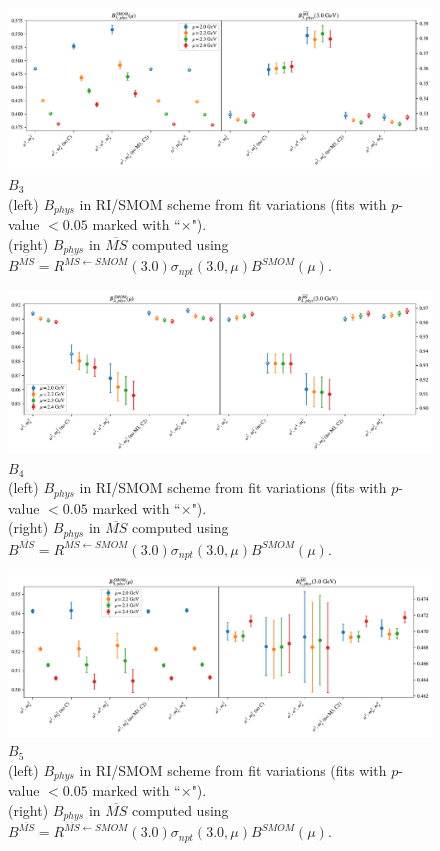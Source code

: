 \documentclass[12pt]{extarticle}
\begin{document}
\begin{figure}
\centering
\includegraphics[page=1, width=1.1\textwidth]{SSmPP/SUSY/fit_summary.pdf}
\caption{$B_{3}$\\(left) $B_{phys}$ in RI/SMOM scheme from fit variations (fits with $p$-value $<0.05$ marked with ``$\times$"). \\(right) $B_{phys}$ in $\overline{MS}$ computed using $B^{\overline{MS}} = R^{\overline{MS}\leftarrow SMOM}(3.0)\sigma_{npt}(3.0,\mu) B^{SMOM}(\mu)$.}
\end{figure}
\clearpage
\begin{figure}
\centering
\includegraphics[page=1, width=1.1\textwidth]{SSpPP/SUSY/fit_summary.pdf}
\caption{$B_{4}$\\(left) $B_{phys}$ in RI/SMOM scheme from fit variations (fits with $p$-value $<0.05$ marked with ``$\times$"). \\(right) $B_{phys}$ in $\overline{MS}$ computed using $B^{\overline{MS}} = R^{\overline{MS}\leftarrow SMOM}(3.0)\sigma_{npt}(3.0,\mu) B^{SMOM}(\mu)$.}
\end{figure}
\clearpage
\begin{figure}
\centering
\includegraphics[page=1, width=1.1\textwidth]{TT/SUSY/fit_summary.pdf}
\caption{$B_{5}$\\(left) $B_{phys}$ in RI/SMOM scheme from fit variations (fits with $p$-value $<0.05$ marked with ``$\times$"). \\(right) $B_{phys}$ in $\overline{MS}$ computed using $B^{\overline{MS}} = R^{\overline{MS}\leftarrow SMOM}(3.0)\sigma_{npt}(3.0,\mu) B^{SMOM}(\mu)$.}
\end{figure}
\clearpage
\end{document}
